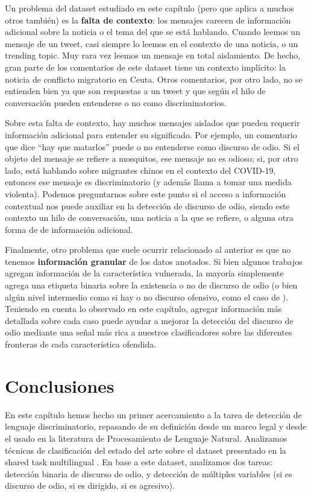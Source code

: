 
Un problema del dataset estudiado en este capítulo (pero que aplica a muchos otros también) es la \textbf{falta de contexto}: los mensajes carecen de información adicional sobre la noticia o el tema del que se está hablando. Cuando leemos un mensaje de un tweet, casi siempre lo leemos en el contexto de una noticia, o un trending topic. Muy rara vez leemos un mensaje en total aislamiento. De hecho, gran parte de los comentarios de este dataset tiene un contexto implícito: la noticia de conflicto migratorio en Ceuta. Otros comentarios, por otro lado, no se entienden bien ya que son respuestas a un tweet y que según el hilo de conversación pueden entenderse o no como discriminatorios.

Sobre esta falta de contexto, hay muchos mensajes aislados que pueden requerir información adicional para entender su significado. Por ejemplo, un comentario que dice ``hay que matarlos'' puede o no entenderse como discurso de odio. Si el objeto del mensaje se refiere a mosquitos, ese mensaje no es odioso; si, por otro lado, está hablando sobre migrantes chinos en el contexto del COVID-19, entonces ese mensaje es discriminatorio (y además llama a tomar una medida violenta). Podemos preguntarnos sobre este punto si el acceso a información contextual nos puede auxiliar en la detección de discurso de odio, siendo este contexto un hilo de conversación, una noticia a la que se refiere, o alguna otra forma de de información adicional.

Finalmente, otro problema que suele ocurrir relacionado al anterior es que no tenemos \textbf{información granular} de los datos anotados. Si bien algunos trabajos agregan información de la característica vulnerada, la mayoría simplemente agrega una etiqueta binaria sobre la existencia o no de discurso de odio (o bien algún nivel intermedio como si hay o no discurso ofensivo, como el caso de \citet{Davidson2017AutomatedHS}). Teniendo en cuenta lo observado en este capítulo, agregar información más detallada sobre cada caso puede ayudar a mejorar la detección del discurso de odio mediante una señal más rica a nuestros clasificadores sobre las diferentes fronteras de cada característica ofendida.


\section{Conclusiones}

En este capítulo hemos hecho un primer acercamiento a la tarea de detección de lenguaje discriminatorio, repasando de su definición desde un marco legal y desde el usado en la literatura de Procesamiento de Lenguaje Natural. Analizamos técnicas de clasificación del estado del arte sobre el dataset presentado en la shared task multilingual \cite{hateval2019semeval}. En base a este dataset, analizamos dos tareas: detección binaria de discurso de odio, y detección de múltiples variables (si es discurso de odio, si es dirigido, si es agresivo).

